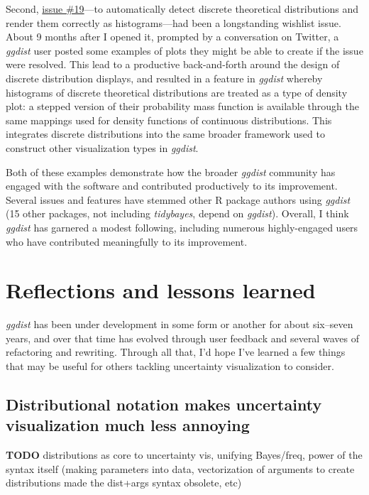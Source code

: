 \documentclass[journal]{vgtc}                     %
\begin{document}
Second, \href{https://github.com/mjskay/ggdist/issues/19}{issue \#19}---to automatically detect discrete theoretical distributions and render them correctly as histograms---had been a longstanding wishlist issue. About 9 months after I opened it, prompted by a conversation on Twitter, a \textit{ggdist} user posted some examples of plots they might be able to create if the issue were resolved. This lead to a productive back-and-forth around the design of discrete distribution displays, and resulted in a feature in \textit{ggdist} whereby histograms of discrete theoretical distributions are treated as a type of density plot: a stepped version of their probability mass function is available through the same mappings used for density functions of continuous distributions. This integrates discrete distributions into the same broader framework used to construct other visualization types in \textit{ggdist}.

Both of these examples demonstrate how the broader \textit{ggdist} community has engaged with the software and contributed productively to its improvement. Several issues and features have stemmed other R package authors using \textit{ggdist}  (15 other packages, not including \textit{tidybayes}, depend on \textit{ggdist}). Overall, I think \textit{ggdist} has garnered a modest following, including numerous highly-engaged users who have contributed meaningfully to its improvement. 

\section{Reflections and lessons learned}

\textit{ggdist} has been under development in some form or another for about six--seven years, and over that time has evolved through user feedback and several waves of refactoring and rewriting. Through all that, I'd hope I've learned a few things that may be useful for others tackling uncertainty visualization to consider.

\subsection{Distributional notation makes uncertainty visualization much less annoying}
\textbf{TODO} distributions as core to uncertainty vis, unifying Bayes/freq, power of the syntax itself (making parameters into data, vectorization of arguments to create distributions made the dist+args syntax obsolete, etc)
\end{document}
